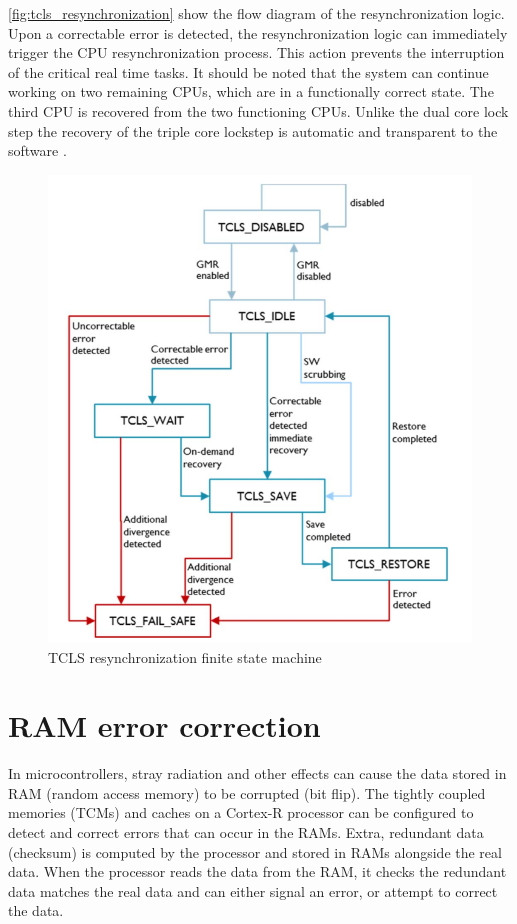 \autoref{fig:tcls_resynchronization} show the flow diagram of the resynchronization logic. Upon a correctable error is detected, the resynchronization logic can immediately trigger the CPU resynchronization process. This action prevents the interruption of the critical real time tasks. It should be noted that the system can continue working on two remaining CPUs, which are in a functionally correct state. The third CPU is recovered from the two functioning CPUs. Unlike the dual core lock step the recovery of the triple core lockstep is automatic and transparent to the software \citep{TCLS_cortex_r}.

\begin{figure}[H]

      \centering
      \includegraphics[width=0.9\linewidth]{images/tcls_resynchronization.png}
      \caption{TCLS resynchronization finite state machine \citep{TCLS_cortex_r}}
      \label{fig:tcls_resynchronization}
    
\end{figure}

\section{RAM error correction}

In microcontrollers, stray radiation and other effects can cause the data stored in RAM (random access memory) to be corrupted (bit flip).  The tightly coupled memories (TCMs) and caches on a Cortex-R processor can be configured to detect and correct errors that can occur in the RAMs. Extra, redundant data (checksum) is computed by the processor and stored in RAMs alongside the real data. When the processor reads the data from the RAM, it checks the redundant data matches the real data and can either signal an error, or attempt to correct the data.

